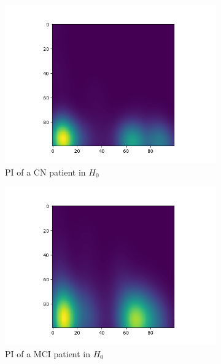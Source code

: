 \documentclass{article}
\begin{document}
\begin{figure}
  \centering
  \begin{subfigure}{0.3\textwidth}
    \includegraphics[width=\textwidth]{figures/PIs/Persistence_image_CN_h_0.png}
    \caption{PI of a CN patient in $H_0$}
  \end{subfigure}
  \begin{subfigure}{0.3\textwidth}
    \includegraphics[width=\textwidth]{figures/PIs/Persistence_image_MCI_h_0.png}
    \caption{PI of a MCI patient in $H_0$}
  \end{subfigure}
  \begin{subfigure}{0.3\textwidth}

\end{subfigure}
\end{figure}
\end{document}
